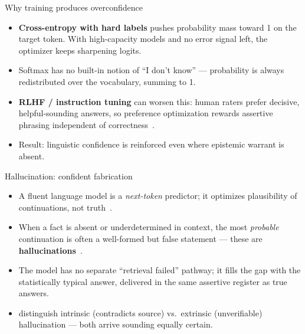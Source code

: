 \documentclass[aspectratio=169,11pt]{beamer}
\begin{document}
\begin{frame}{Why training produces overconfidence}
  \begin{itemize}
    \item \textbf{Cross-entropy with hard labels} pushes probability mass toward 1 on the target token. With high-capacity models and no error signal left, the optimizer keeps sharpening logits.
    \item Softmax has no built-in notion of ``I don't know'' --- probability is always redistributed over the vocabulary, summing to 1.
    \item \textbf{RLHF / instruction tuning} can worsen this: human raters prefer decisive, helpful-sounding answers, so preference optimization rewards assertive phrasing independent of correctness~\citep{ouyang2022instructgpt}.
    \item Result: linguistic confidence is reinforced even where epistemic warrant is absent.
  \end{itemize}
\end{frame}

\begin{frame}{Hallucination: confident fabrication}
  \begin{itemize}
    \item A fluent language model is a \emph{next-token} predictor; it optimizes plausibility of continuations, not truth~\citep{bender2021parrots}.
    \item When a fact is absent or underdetermined in context, the most \emph{probable} continuation is often a well-formed but false statement --- these are \textbf{hallucinations}~\citep{ji2023survey}.
    \item The model has no separate ``retrieval failed'' pathway; it fills the gap with the statistically typical answer, delivered in the same assertive register as true answers.
    \item \citet{ji2023survey} distinguish intrinsic (contradicts source) vs.\ extrinsic (unverifiable) hallucination --- both arrive sounding equally certain.
  \end{itemize}
\end{frame}
\end{document}
